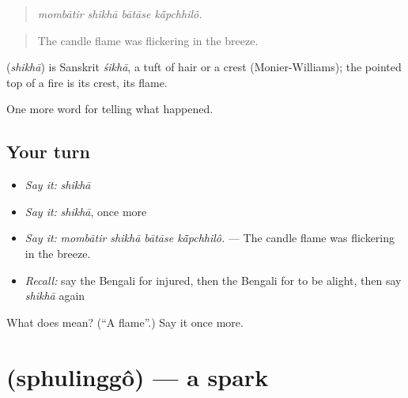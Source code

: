 \begin{quote}
   
\end{quote}

\begin{quote}
\emph{mombātir shikhā bātāse kā̃pchhilô.}
\end{quote}

\begin{quote}
The candle flame was flickering in the breeze.
\end{quote}

\begin{cousinweb}
\textbf{} (\emph{shikhā}) is Sanskrit \emph{śikhā}, a tuft of hair or a crest (Monier-Williams); the pointed top of a fire is its crest, its flame.
\end{cousinweb}

\begin{grammarlens}[title={What you've built}]
One more word for telling what happened.
\end{grammarlens}

\subsection*{Your turn}
\begin{itemize}
\raggedright
  \item \emph{Say it:} \emph{shikhā}
  \item \emph{Say it:} \emph{shikhā}, once more
  \item \emph{Say it:} \emph{mombātir shikhā bātāse kā̃pchhilô.} — The candle flame was flickering in the breeze.
  \item \emph{Recall:} say the Bengali for injured, then the Bengali for to be alight, then say \emph{shikhā} again
\end{itemize}

\begin{tcolorbox}[breakable,colback=teal!4,colframe=teal!35!black,title={Before you move on}]
What does  mean? (\textquotedblleft{}A flame\textquotedblright{}.) Say it once more.
\end{tcolorbox}
\section[\texorpdfstring{\bn{স্ফুলিঙ্গ} (sphulinggô)}{স্ফুলিঙ্গ (sphulinggô)}]{ (sphulinggô) — a spark}

\label{lesson:BN-C279-sphulinggo}



